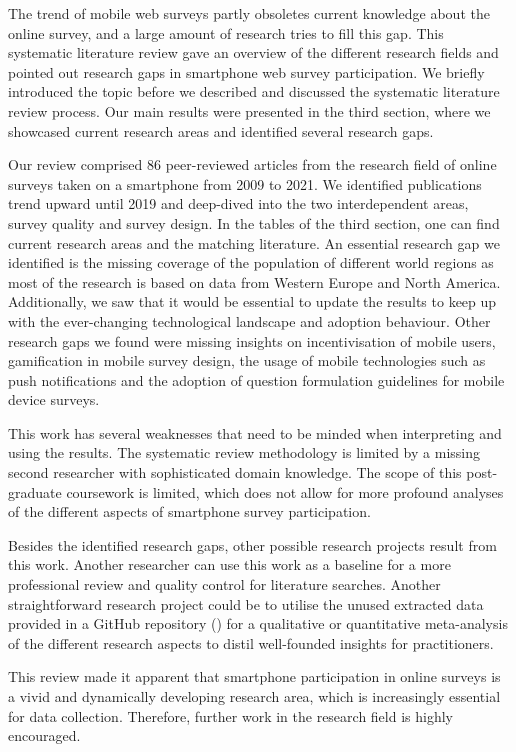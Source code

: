 The trend of mobile web surveys partly obsoletes current knowledge about the online survey, and a large amount of research tries to fill this gap. This systematic literature review gave an overview of the different research fields and pointed out research gaps in smartphone web survey participation. We briefly introduced the topic before we described and discussed the systematic literature review process. Our main results were presented in the third section, where we showcased current research areas and identified several research gaps.  

Our review comprised 86 peer-reviewed articles from the research field of online surveys taken on a smartphone from 2009 to 2021. We identified publications trend upward until 2019 and deep-dived into the two interdependent areas, survey quality and survey design. In the tables of the third section, one can find current research areas and the matching literature. An essential research gap we identified is the missing coverage of the population of different world regions as most of the research is based on data from Western Europe and North America. Additionally, we saw that it would be essential to update the results to keep up with the ever-changing technological landscape and adoption behaviour. Other research gaps we found were missing insights on incentivisation of mobile users, gamification in mobile survey design, the usage of mobile technologies such as push notifications and the adoption of question formulation guidelines for mobile device surveys. 

This work has several weaknesses that need to be minded when interpreting and using the results. The systematic review methodology is limited by a missing second researcher with sophisticated domain knowledge. The scope of this post-graduate coursework is limited, which does not allow for more profound analyses of the different aspects of smartphone survey participation. 

Besides the identified research gaps, other possible research projects result from this work. Another researcher can use this work as a baseline for a more professional review and quality control for literature searches. Another straightforward research project could be to utilise the unused extracted data provided in a GitHub repository (\cite{langenbahn_smartphone_2021}) for a qualitative or quantitative meta-analysis of the different research aspects to distil well-founded insights for practitioners.

This review made it apparent that smartphone participation in online surveys is a vivid and dynamically developing research area, which is increasingly essential for data collection. Therefore, further work in the research field is highly encouraged.



